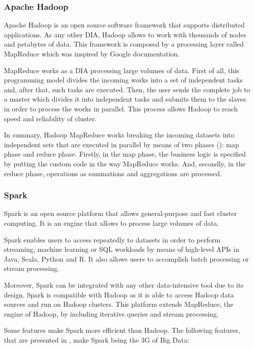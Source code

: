 \subsubsection{Apache Hadoop}

Apache Hadoop is an open source software framework that supports distributed applications. As any other DIA, Hadoop allows to work with thousands of nodes and petabytes of data. This framework is composed by a processing layer called MapReduce which was inspired by Google documentation.

MapReduce works as a DIA processing large volumes of data. First of all, this programming model divides the incoming works into a set of independent tasks and, after that, such tasks are executed. Then, the user sends the complete job to a master which divides it into independent tasks and submits them to the slaves in order to process the works in parallel. This process allows Hadoop to reach speed and reliability of cluster.

In summary, Hadoop MapReduce works breaking the incoming datasets into independent sets that are executed in parallel by means of two phases (\cite{hadoopwebsite}): map phase and reduce phase. Firstly, in the map phase, the business logic is specified by putting the custom code in the way MapReduce works. And, secondly, in the reduce phase, operations as summations and aggregations are processed.

\subsubsection{Spark}

Spark is an open source platform that allows general-purpose and fast cluster computing. It is an engine that allows to process large volumes of data.

Spark enables users to access repeatedly to datasets in order to perform streaming, machine learning or SQL workloads by means of high-level APIs in Java, Scala, Python and R. It also allows users to accomplish batch processing or stream processing.

Moreover, Spark can be integrated with any other data-intensive tool due to its design. Spark is compatible with Hadoop as it is able to access Hadoop data sources and run on Hadoop clusters. This platform extends MapReduce, the engine of Hadoop, by including iterative queries and stream processing.

Some features make Spark more efficient than Hadoop. The following features, that are presented in \cite{sparkwebsite}, make Spark being the 3G of Big Data:

